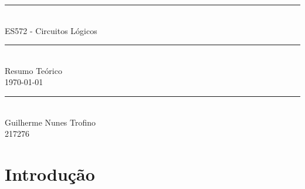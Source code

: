 \documentclass{article}
\begin{document}
    \begin{titlepage}
        \begin{center}
            \rule{450pt}{0.5pt}\\[4mm]
            {\Huge ES572 - Circuitos Lógicos}\\
            \rule{450pt}{0.5pt}\\[2mm]
            {\Large Resumo Teórico}\\[200mm]
            \today\\
            \rule{250pt}{0.5pt}\\
            {\large Guilherme Nunes Trofino}\\
            {\large 217276}\\
        \end{center}
    \end{titlepage}
\newpage

    \tableofcontents
\newpage

    \section{Introdução}
\end{document}

